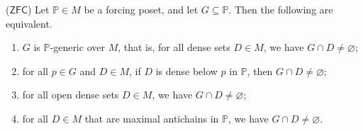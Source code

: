 \begin{proposition}
    (\( \mathsf{ZFC} \))
    Let \( \mathbb P \in M \) be a forcing poset, and let \( G \subseteq \mathbb P \).
    Then the following are equivalent.
    \begin{enumerate}
        \item \( G \) is \( \mathbb P \)-generic over \( M \), that is, for all dense sets \( D \in M \), we have \( G \cap D \neq \varnothing \);
        \item for all \( p \in G \) and \( D \in M \), if \( D \) is dense below \( p \) in \( \mathbb P \), then \( G \cap D \neq \varnothing \);
        \item for all open dense sets \( D \in M \), we have \( G \cap D \neq \varnothing \);
        \item for all \( D \in M \) that are maximal antichains in \( \mathbb P \), we have \( G \cap D \neq \varnothing \).
    \end{enumerate}
\end{proposition}

